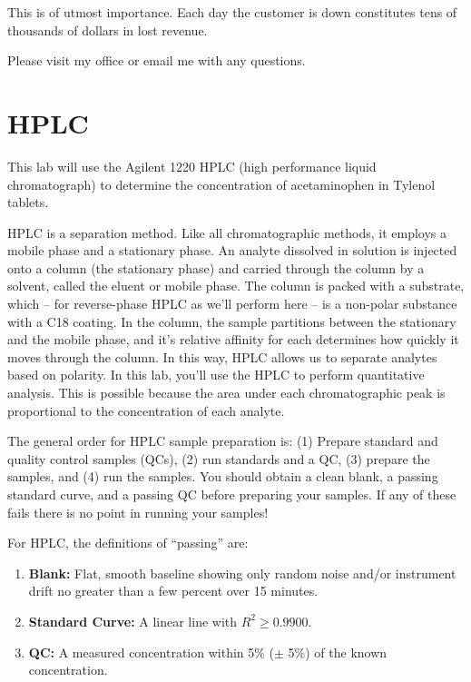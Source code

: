 \documentclass[]{tufte-book}
\providecommand{\tightlist}{%
  \setlength{\itemsep}{0pt}\setlength{\parskip}{0pt}}
\begin{document}
This is of utmost importance. Each day the customer is down constitutes tens of thousands of dollars in lost revenue.

Please visit my office or email me with any questions.

\newpage

\hypertarget{am-hplc}{%
\section{HPLC}\label{am-hplc}}

This lab will use the Agilent 1220 HPLC (high performance liquid chromatograph) to determine the concentration of acetaminophen in Tylenol tablets.

HPLC is a separation method. Like all chromatographic methods, it employs a mobile phase and a stationary phase. An analyte dissolved in solution is injected onto a column (the stationary phase) and carried through the column by a solvent, called the eluent or mobile phase. The column is packed with a substrate, which -- for reverse-phase HPLC as we'll perform here -- is a non-polar substance with a C18 coating. In the column, the sample partitions between the stationary and the mobile phase, and it's relative affinity for each determines how quickly it moves through the column. In this way, HPLC allows us to separate analytes based on polarity. In this lab, you'll use the HPLC to perform quantitative analysis. This is possible because the area under each chromatographic peak is proportional to the concentration of each analyte.

The general order for HPLC sample preparation is: (1) Prepare standard and quality control samples (QCs), (2) run standards and a QC, (3) prepare the samples, and (4) run the samples. You should obtain a clean blank, a passing standard curve, and a passing QC before preparing your samples. If any of these fails there is no point in running your samples!

For HPLC, the definitions of ``passing'' are:

\begin{enumerate}
\def\labelenumi{\arabic{enumi}.}
\tightlist
\item
  \textbf{Blank:} Flat, smooth baseline showing only random noise and/or instrument drift no greater than a few percent over 15 minutes.\\
\item
  \textbf{Standard Curve:} A linear line with \(R^2 \ge 0.9900\).\\
\item
  \textbf{QC:} A measured concentration within 5\% (\(\pm\) 5\%) of the known concentration.
\end{enumerate}
\end{document}
